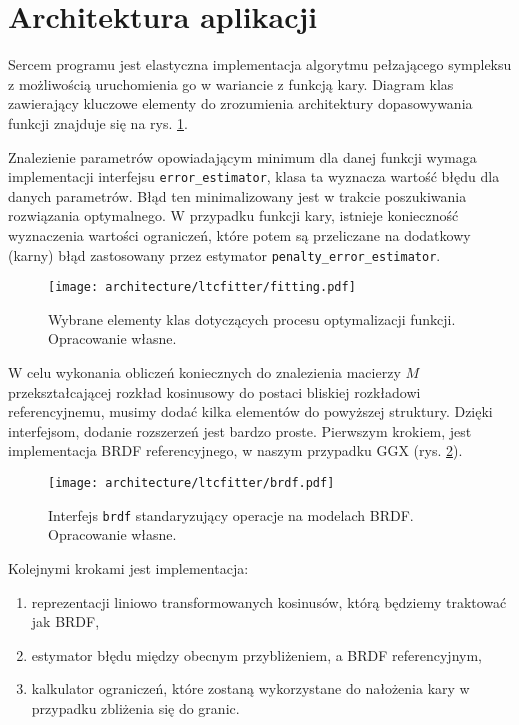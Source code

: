 \documentclass[../main.tex]{subfiles}
\newcommand{\graphvizscale}{0.09}
\begin{document}
\section{Architektura aplikacji}

Sercem programu jest elastyczna implementacja algorytmu pełzającego sympleksu z możliwością uruchomienia go w wariancie z funkcją kary. Diagram klas zawierający kluczowe elementy do zrozumienia architektury dopasowywania funkcji znajduje się na rys. \ref{fig:FunctionSolveClassDiagram}. 

Znalezienie parametrów opowiadającym minimum dla danej funkcji wymaga implementacji interfejsu \texttt{error\_estimator}, klasa ta wyznacza wartość błędu dla danych parametrów. Błąd ten minimalizowany jest w trakcie poszukiwania rozwiązania optymalnego. W przypadku funkcji kary, istnieje konieczność wyznaczenia wartości ograniczeń, które potem są przeliczane na dodatkowy (karny) błąd zastosowany przez estymator \texttt{penalty\_error\_estimator}. 

\begin{figure}[h]
    \centering
    \texttt{[image: architecture/ltcfitter/fitting.pdf]}
    \caption{Wybrane elementy klas dotyczących procesu optymalizacji funkcji. Opracowanie własne.}
    \label{fig:FunctionSolveClassDiagram}
\end{figure}

W celu wykonania obliczeń koniecznych do znalezienia macierzy $M$ przekształcającej rozkład kosinusowy do postaci bliskiej rozkładowi referencyjnemu, musimy dodać kilka elementów do powyższej struktury. Dzięki interfejsom, dodanie rozszerzeń jest bardzo proste. Pierwszym krokiem, jest implementacja BRDF referencyjnego, w naszym przypadku GGX (rys. \ref{fig:BRDFClassDiagram}).

\begin{figure}[h]
    \centering
    \texttt{[image: architecture/ltcfitter/brdf.pdf]}
    \caption{Interfejs \texttt{brdf} standaryzujący operacje na modelach BRDF. Opracowanie własne.}
    \label{fig:BRDFClassDiagram}
\end{figure}

Kolejnymi krokami jest implementacja: 
\begin{enumerate}
    \item reprezentacji liniowo transformowanych kosinusów, którą będziemy traktować jak BRDF,
    \item estymator błędu między obecnym przybliżeniem, a BRDF referencyjnym,
    \item kalkulator ograniczeń, które zostaną wykorzystane do nałożenia kary w przypadku zbliżenia się do granic.
\end{enumerate}
\end{document}
